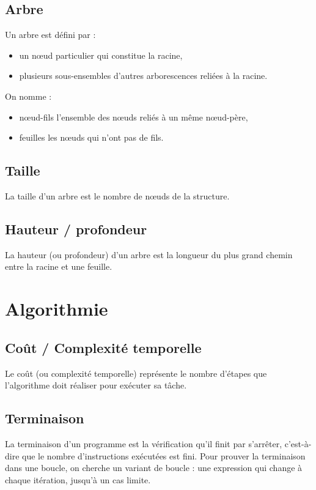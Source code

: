 \documentclass{article}
\begin{document}
\subsection{Arbre}
Un arbre est défini par :
\begin{itemize}
  \item un nœud particulier qui constitue la racine,
  \item plusieurs sous-ensembles d’autres arborescences reliées à la racine.
\end{itemize}

On nomme :
\begin{itemize}
  \item nœud-fils l’ensemble des nœuds reliés à un même nœud-père,
  \item feuilles les nœuds qui n’ont pas de fils.
\end{itemize}

\subsection{Taille}
La taille d’un arbre est le nombre de nœuds de la structure.

\subsection{Hauteur / profondeur}
La hauteur (ou profondeur) d’un arbre est la longueur du plus grand chemin entre la racine et une feuille.

\section{Algorithmie}

\subsection{Coût / Complexité temporelle}
Le coût (ou complexité temporelle) représente le nombre d’étapes que l’algorithme doit réaliser pour exécuter sa tâche.

\subsection{Terminaison}
La terminaison d’un programme est la vérification qu’il finit par s’arrêter, c’est-à-dire que le nombre d’instructions exécutées est fini.  
Pour prouver la terminaison dans une boucle, on cherche un variant de boucle : une expression qui change à chaque itération, jusqu’à un cas limite.
\end{document}
